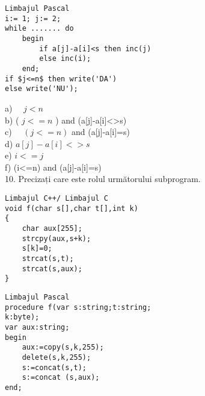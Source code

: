 \begin{verbatim}
Limbajul Pascal
i:= 1; j:= 2;
while ....... do
    begin
        if a[j]-a[i]<s then inc(j)
        else inc(i);
    end;
if $j<=n$ then write('DA')
else write('NU');
\end{verbatim}

a) $\quad j<n$\\
b) ( $j<=n$ ) and (a[j]-a[i]<>s)\\
c) $\quad(j<=n)$ and (a[j]-a[i]=s)\\
d) $a[j]-a[i]<>s$\\
e) $i<=j$\\[0pt]
f) (i<=n) and (a[j]-a[i]=s)\\
10. Precizați care este rolul următorului subprogram.

\begin{verbatim}
Limbajul C++/ Limbajul C
void f(char s[],char t[],int k)
{
    char aux[255];
    strcpy(aux,s+k);
    s[k]=0;
    strcat(s,t);
    strcat(s,aux);
}
\end{verbatim}

\begin{verbatim}
Limbajul Pascal
procedure f(var s:string;t:string;
k:byte);
var aux:string;
begin
    aux:=copy(s,k,255);
    delete(s,k,255);
    s:=concat(s,t);
    s:=concat (s,aux);
end;
\end{verbatim}


